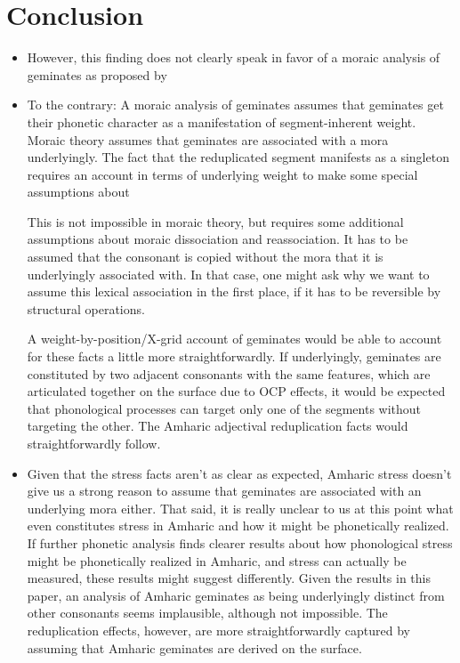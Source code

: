 \documentclass[12pt]{article}
\begin{document}
\section{Conclusion}

\begin{itemize}
	\item However, this finding does not clearly speak in favor of a moraic analysis of geminates as proposed by \cite{sande-hedding14}
	\item To the contrary: A moraic analysis of geminates assumes that geminates get their phonetic character as a manifestation of segment-inherent weight. Moraic theory assumes that geminates are associated with a mora underlyingly. The fact that the reduplicated segment manifests as a singleton requires an account in terms of underlying weight to make some special assumptions about 

	This is not impossible in moraic theory, but requires some additional assumptions about moraic dissociation and reassociation. It has to be assumed that the consonant is copied without the mora that it is underlyingly associated with. In that case, one might ask why we want to assume this lexical association in the first place, if it has to be reversible by structural operations.

	A weight-by-position/X-grid account of geminates would be able to account for these facts a little more straightforwardly. If underlyingly, geminates are constituted by two adjacent consonants with the same features, which are articulated together on the surface due to OCP effects, it would be expected that phonological processes can target only one of the segments without targeting the other. The Amharic adjectival reduplication facts would straightforwardly follow.

	\item Given that the stress facts aren't as clear as expected, Amharic stress doesn't give us a strong reason to assume that geminates are associated with an underlying mora either. That said, it is really unclear to us at this point what even constitutes stress in Amharic and how it might be phonetically realized. If further phonetic analysis finds clearer results about how phonological stress might be phonetically realized in Amharic, and stress can actually be measured, these results might suggest differently. Given the results in this paper, an analysis of Amharic geminates as being underlyingly distinct from other consonants seems implausible, although not impossible. The reduplication effects, however, are more straightforwardly captured by assuming that Amharic geminates are derived on the surface.

\end{itemize}





\end{document}
